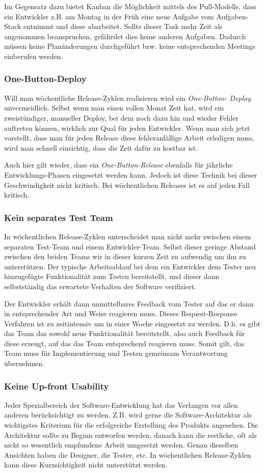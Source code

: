 Im Gegensatz dazu bietet Kanban die Möglichkeit mittels des Pull-Modells, dass
ein Entwickler z.B. am Montag in der Früh eine neue Aufgabe vom Aufgaben-Stack
entnimmt und diese abarbeitet. Sollte dieser Task mehr Zeit als angenommen
beanspruchen, gefährdet dies keine anderen Aufgaben. Dadurch müssen keine
Planänderungen durchgeführt bzw. keine entsprechenden Meetings einberufen
werden.

\subsubsection{One-Button-Deploy}
Will man wöchentliche Release-Zyklen realisieren wird ein \emph{One-Button-
Deploy} unvermeidlich. Selbst wenn man einen vollen Monat Zeit hat, wird ein
zweistündiger, manueller Deploy, bei dem noch dazu hin und wieder Fehler
auftreten können, wirklich zur Qual für jeden Entwickler. Wenn man sich jetzt
vorstellt, dass man für jeden Release diese fehleranfällige Arbeit erledigen
muss, wird man schnell einsichtig, dass die Zeit dafür zu kostbar ist.

Auch hier gilt wieder, dass ein \emph{One-Button-Release} ebenfalls für
jährliche Entwicklungs-Phasen eingesetzt werden kann. Jedoch ist diese Technik
bei dieser Geschwindigkeit nicht kritisch. Bei wöchentlichen Releases ist es
auf jeden Fall kritisch.

\subsubsection{Kein separates Test Team}
In wöchentlichen Release-Zyklen unterscheidet man nicht mehr zwischen einem
separaten Test-Team und einem Entwickler-Team. Selbst dieser geringe Abstand
zwischen den beiden Teams wir in dieser kurzen Zeit zu aufwendig um ihn zu
unterstützen. Der typische Arbeitsablauf bei dem ein Entwickler dem Tester neu
hinzugefügte Funktionalität zum Testen bereitstellt, und dieser dann
selbstständig das erwartete Verhalten der Software verifiziert.

Der Entwickler erhält dann unmittelbares Feedback vom Tester auf das er dann
in entsprechender Art und Weise reagieren muss. Dieses Request-Response
Verfahren ist zu zeitintensiv um in einer Woche eingesetzt zu werden. D.h. es
gibt das Team das sowohl neue Funktionalität bereitstellt, also auch Feedback
für diese erzeugt, auf das das Team entsprechend reagieren muss. Somit gilt,
das Team muss für Implementierung und Testen gemeinsam Verantwortung
übernehmen.

\subsubsection{Keine Up-front Usability}
Jeder Spezialbereich der Software-Entwicklung hat das Verlangen vor allen
anderen berücksichtigt zu werden. Z.B. wird gerne die Software-Architektur als
wichtigstes Kriterium für die erfolgreiche Erstellung des Produkts angesehen.
Die Architektur sollte zu Beginn entworfen werden, danach kann die restliche,
oft als nicht so wesentlich empfundene Arbeit umgesetzt werden. Genau
dieselben Ansichten haben die Designer, die Tester, etc. In wöchentlichen
Release-Zyklen kann diese Kurzsichtigkeit nicht unterstützt werden.

